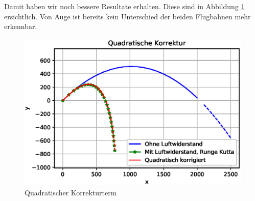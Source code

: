 Damit haben wir noch bessere Resultate erhalten.
Diese sind in Abbildung \ref{naive_quadratic_term} ersichtlich.
Von Auge ist bereits kein Unterschied der beiden Flugbahnen mehr erkennbar.
\begin{figure}
    \centering
    \includegraphics[scale = 0.7]{papers/perturbation/bilder/perturbation_fig2.eps}
    \caption{Quadratischer Korrekturterm}
	\label{naive_quadratic_term}
\end{figure}